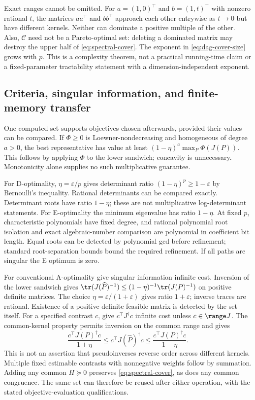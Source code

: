 Exact ranges cannot be omitted. For $a=(1,0)^\top$ and
$b=(1,t)^\top$ with nonzero rational $t$, the matrices $aa^\top$ and
$bb^\top$ approach each other entrywise as $t\to0$ but have different
kernels. Neither can dominate a positive multiple of the other. Also,
$\mathcal C$ need not be a Pareto-optimal set: deleting a dominated matrix
may destroy the upper half of \eqref{eq:spectral-cover}.
The exponent in \eqref{eq:dag-cover-size} grows with $p$. This is a
complexity theorem, not a practical running-time claim or a fixed-parameter
tractability statement with a dimension-independent exponent.

\subsection{Criteria, singular information, and finite-memory transfer}
\label{subsec:spectral-consequences}
One computed set supports objectives chosen afterwards, provided their
values can be compared. If $\Phi\ge0$ is Loewner-nondecreasing and
homogeneous of degree $a>0$, the best representative has value at least
$(1-\eta)^a\max_P\Phi(J(P))$. This follows by applying $\Phi$ to the lower
sandwich; concavity is unnecessary. Monotonicity alone supplies no such
multiplicative guarantee.

For D-optimality, $\eta=\varepsilon/p$ gives determinant ratio
$(1-\eta)^p\ge1-\varepsilon$ by Bernoulli's inequality. Rational
determinants can be compared exactly. Determinant roots have ratio
$1-\eta$; these are not multiplicative log-determinant statements.
For E-optimality the minimum eigenvalue has ratio $1-\eta$. At fixed $p$,
characteristic polynomials have fixed degree, and rational polynomial root
isolation and exact algebraic-number comparison are polynomial in coefficient
bit length. Equal roots can be detected by polynomial gcd before refinement;
standard root-separation bounds bound the required refinement. If all paths
are singular the E optimum is zero.

For conventional A-optimality give singular information infinite cost.
Inversion of the lower sandwich gives
$\tr(J(\widehat P)^{-1})\le(1-\eta)^{-1}\tr(J(P)^{-1})$ on positive
definite matrices. The choice $\eta=\varepsilon/(1+\varepsilon)$ gives
ratio $1+\varepsilon$; inverse traces are rational. Existence of a positive
definite feasible matrix is detected by the set itself. For a specified
contrast $c$, give $c^\top J^\dagger c$ infinite cost unless
$c\in\range J$. The common-kernel property permits inversion on the
common range and gives
\[
 \frac{c^\top J(P)^\dagger c}{1+\eta}
 \le c^\top J(\widehat P)^\dagger c
 \le\frac{c^\top J(P)^\dagger c}{1-\eta}.
\]
This is not an assertion that pseudoinverses reverse order across different
kernels. Multiple fixed estimable contrasts with nonnegative weights follow
by summation. Adding any common $H\succeq0$ preserves
\eqref{eq:spectral-cover}, as does any common congruence. The same set can
therefore be reused after either operation, with the stated objective-evaluation
qualifications.

